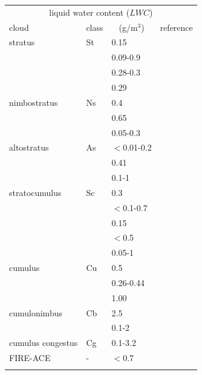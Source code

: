\begin{table}[!htb]
\begin{center}
\begin{tabular}{llll}
\hline
\multicolumn{4}{c}{liquid water content ($LWC$)} \\
 cloud        & class & \multicolumn{1}{c}{(g/m$^3$)} & reference\\
\hline
 stratus      & St    & 0.15        & \citet{salby:96}\\
              &       & 0.09-0.9    & \citet{seinfeld:98}\\
              &       & 0.28-0.3    & \citet{hess:98}\\
              &       & 0.29        & \citet{abreu:96}\\
 nimbostratus & Ns    & 0.4         & \citet{salby:96}\\
              &       & 0.65        & \citet{abreu:96}\\
              &       & 0.05-0.3    & \citet{berton:00}\\
 altostratus  & As    & $<$0.01-0.2 & \citet{seinfeld:98}\\
              &       & 0.41        & \citet{abreu:96}\\
              &       & 0.1-1       & \citet{berton:00}\\
 stratocumulus& Sc    & 0.3         & \citet{salby:96}\\
              &       & $<$0.1-0.7  & \citet{seinfeld:98}\\
              &       & 0.15        & \citet{abreu:96}\\
              &       & $<$0.5      & \citet{pawlowskaetal:00}\\
              &       & 0.05-1      & \citet{berton:00}\\
 cumulus      & Cu    & 0.5         & \citet{salby:96}\\
              &       & 0.26-0.44   & \citet{hess:98}\\
              &       & 1.00        & \citet{abreu:96}\\
 cumulonimbus & Cb    & 2.5         & \citet{salby:96}\\
              &       & 0.1-2       & \citet{berton:00}\\
 cumulus 
    congestus & Cg    & 0.1-3.2     & \citet{berton:00}\\
FIRE-ACE      & -     & $<$0.7      & \citet{shupeetal:00}\\
\hline
\multicolumn{4}{c}{}  \\

\end{tabular}
\end{center}
\end{table}
